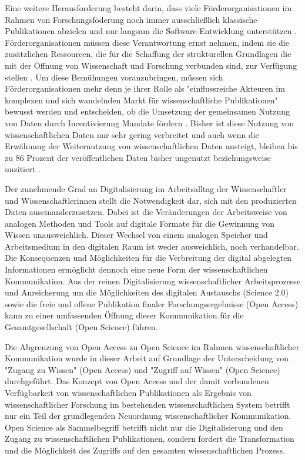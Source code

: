 Eine weitere Herausforderung besteht darin, dass viele Förderorganisationen im Rahmen von Forschungsföderung noch immer ausschließlich klassische Publikationen abzielen und nur langsam die Software-Entwicklung unterstützen \cite{hey_2015_open}. Förderorganisationen müssen diese Verantwortung ernst nehmen, indem sie die zusätzlichen Ressourcen, die für die Schaffung der strukturellen Grundlagen die mit der Öffnung von Wissenschaft und Forschung verbunden sind, zur Verfügung stellen \cite{mennes_2013_making_os} \cite{patlak_2010_open}. Um diese Bemühungen voranzubringen, müssen sich Förderorganisationen mehr denn je ihrer Rolle als "einflussreiche  Akteuren  im  komplexen und  sich  wandelnden  Markt  für  wissenschaftliche  Publikationen" \cite{wein_2010_erwerbung} bewusst werden und entscheiden, ob die Umsetzung der gemeinsamen Nutzung von Daten durch Incentivierung Mandate fördern \cite{mennes_2013_making_os}. Bisher ist diese Nutzung von wissenschaftlichen Daten nur sehr gering verbreitet und auch wenn die Erwähnung der Weiternutzung von wissenschaftlichen Daten ansteigt, bleiben bis zu 86 Prozent der veröffentlichen Daten bisher ungenutzt beziehungsweise unzitiert \cite{peters_2015_research}.

Der zunehmende Grad an Digitalisierung im Arbeitsalltag der Wissenschaftler und Wissenschaftlerinnen stellt die Notwendigkeit dar, sich mit den produzierten Daten auseinanderzusetzen. Dabei ist die Veränderungen der Arbeitsweise von analogen Methoden und Tools auf digitale Formate für die Gewinnung von Wissen unausweichlich. Dieser Wechsel von einem analogen Speicher und Arbeitsmedium in den digitalen Raum ist weder ausweichlich, noch verhandelbar. Die Konsequenzen und Möglichkeiten für die Verbreitung der digital abgelegten Informationen ermöglicht dennoch eine neue Form der wissenschaftlichen Kommunikation. Aus der reinen Digitalisierung wissenschaftlicher Arbeitsprozesse und Anreicherung um die Möglichkeiten des digitalen Austauschs (Science 2.0) sowie die freie und offene Publikation finaler Forschungsergebnisse (Open Access) kann zu einer umfassenden Öffnung dieser Kommunikation für die Gesamtgesellschaft (Open Science) führen.

Die Abgrenzung von Open Access zu Open Science im Rahmen wissenschaftlicher Kommunikation wurde in dieser Arbeit auf Grundlage der Unterscheidung von "Zugang zu Wissen" (Open Access) und "Zugriff auf Wissen" (Open Science) durchgeführt. Das Konzept von Open Access und der damit verbundenen Verfügbarkeit von wissenschaftlichen Publikationen als Ergebnis von wissenschaftlicher Forschung im bestehenden wissenschaftlichen System betrifft nur ein Teil der grundlegenden Neuordnung wissenschaftlicher Kommunikation. Open Science als Sammelbegriff betrifft nicht nur die Digitalisierung und den Zugang zu wissenschaftlichen Publikationen, sondern fordert die Transformation und die Möglichkeit des Zugriffs auf den gesamten wissenschaftlichen Prozess.

